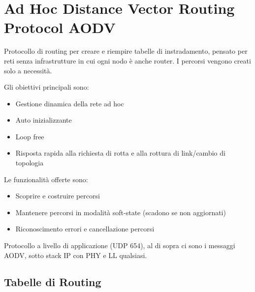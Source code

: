 \section{Ad Hoc Distance Vector Routing Protocol AODV}

Protocollo di routing per creare e riempire tabelle di instradamento, pensato per reti senza infrastrutture in cui ogni nodo è anche router. I percorsi vengono creati solo a necessità. 

Gli obiettivi principali sono: 
\begin{itemize}
    \item Gestione dinamica della rete ad hoc
    
    \item Auto inizializzante
    
    \item Loop free
    
    \item Risposta rapida alla richiesta di rotta e alla rottura di link/cambio di topologia
\end{itemize}

Le funzionalità offerte sono: 
\begin{itemize}
    \item Scoprire e costruire percorsi
    
    \item Mantenere percorsi in modalità soft-state (scadono se non aggiornati)
    
    \item Riconoscimento errori e cancellazione percorsi
\end{itemize}

Protocollo a livello di applicazione (UDP 654), al di sopra ci sono i messaggi AODV, sotto stack IP con PHY e LL qualsiasi.

\subsection{Tabelle di Routing}

